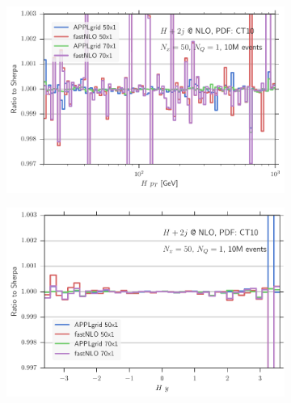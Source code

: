 \begin{figure}
\centering
\begin{subfigure}[]{0.49\textwidth}
	\includegraphics[width=\textwidth]{images/hjjnlo_hpt_70v50.pdf}
\end{subfigure}
\hfill
\begin{subfigure}[]{0.49\textwidth}
	\includegraphics[width=\textwidth]{images/hjjnlo_hy_70v50.pdf}
\end{subfigure}


\end{figure}
